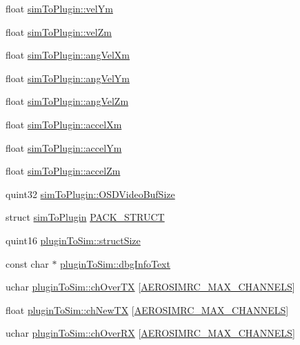 \begin{DoxyCompactItemize}
float \hyperlink{group___aero_sim_r_c_ga78ba6a4d5b2134bed1c2396ff9212df0}{sim\-To\-Plugin\-::vel\-Ym}
\item 
float \hyperlink{group___aero_sim_r_c_ga35865106b3179109ebbec06aed189fad}{sim\-To\-Plugin\-::vel\-Zm}
\item 
float \hyperlink{group___aero_sim_r_c_gac5161f5332b6bc49ca097e2c27be8a22}{sim\-To\-Plugin\-::ang\-Vel\-Xm}
\item 
float \hyperlink{group___aero_sim_r_c_ga1cdf55eb78da8c312e32d9d5be75afef}{sim\-To\-Plugin\-::ang\-Vel\-Ym}
\item 
float \hyperlink{group___aero_sim_r_c_ga4387cb264fd400cd98815e6145b8114c}{sim\-To\-Plugin\-::ang\-Vel\-Zm}
\item 
float \hyperlink{group___aero_sim_r_c_ga8e87f9c4846725309216b66cf48a4fdd}{sim\-To\-Plugin\-::accel\-Xm}
\item 
float \hyperlink{group___aero_sim_r_c_gafb442cc82353fedd9b1a4b1f841a780a}{sim\-To\-Plugin\-::accel\-Ym}
\item 
float \hyperlink{group___aero_sim_r_c_ga15b5242cd24b1253d8fa5a12d07e3b76}{sim\-To\-Plugin\-::accel\-Zm}
\item 
quint32 \hyperlink{group___aero_sim_r_c_ga9c59c8c051c445f8f8b17ed8b42a2820}{sim\-To\-Plugin\-::\-O\-S\-D\-Video\-Buf\-Size}
\item 
struct \hyperlink{structsim_to_plugin}{sim\-To\-Plugin} \hyperlink{group___aero_sim_r_c_gacc1a47760066283f765895e6100c5d81}{\-P\-A\-C\-K\-\_\-\-S\-T\-R\-U\-C\-T}
\item 
quint16 \hyperlink{group___aero_sim_r_c_ga785b39329b27020e1525b4999a10d230}{plugin\-To\-Sim\-::struct\-Size}
\item 
const char $\ast$ \hyperlink{group___aero_sim_r_c_ga8d1dec1f6592d85b15941b3ce658f44a}{plugin\-To\-Sim\-::dbg\-Info\-Text}
\item 
uchar \hyperlink{group___aero_sim_r_c_ga77e9265e0ad99dcc6a7c5cc35da0481d}{plugin\-To\-Sim\-::ch\-Over\-T\-X} \mbox{[}\hyperlink{group___aero_sim_r_c_ga63f989ac10cdcbfefadc5e65055d3c7d}{\-A\-E\-R\-O\-S\-I\-M\-R\-C\-\_\-\-M\-A\-X\-\_\-\-C\-H\-A\-N\-N\-E\-L\-S}\mbox{]}
\item 
float \hyperlink{group___aero_sim_r_c_ga69be322d9251f2d0881402e3bb8b79cc}{plugin\-To\-Sim\-::ch\-New\-T\-X} \mbox{[}\hyperlink{group___aero_sim_r_c_ga63f989ac10cdcbfefadc5e65055d3c7d}{\-A\-E\-R\-O\-S\-I\-M\-R\-C\-\_\-\-M\-A\-X\-\_\-\-C\-H\-A\-N\-N\-E\-L\-S}\mbox{]}
\item 
uchar \hyperlink{group___aero_sim_r_c_ga3fe5834da184407de8227a046d5a7de7}{plugin\-To\-Sim\-::ch\-Over\-R\-X} \mbox{[}\hyperlink{group___aero_sim_r_c_ga63f989ac10cdcbfefadc5e65055d3c7d}{\-A\-E\-R\-O\-S\-I\-M\-R\-C\-\_\-\-M\-A\-X\-\_\-\-C\-H\-A\-N\-N\-E\-L\-S}\mbox{]}

\end{DoxyCompactItemize}
